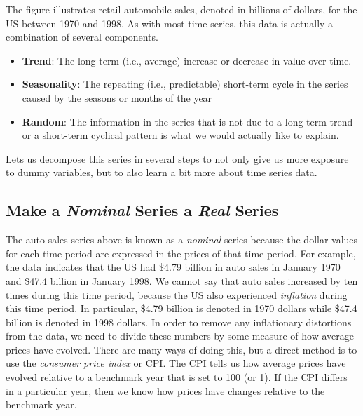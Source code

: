 \documentclass[
]{book}
\begin{document}
The figure illustrates retail automobile sales, denoted in billions of dollars, for the US between 1970 and 1998. As with most time series, this data is actually a combination of several components.

\begin{itemize}
\item
  \textbf{Trend}: The long-term (i.e., average) increase or decrease in value over time.
\item
  \textbf{Seasonality}: The repeating (i.e., predictable) short-term cycle in the series caused by the seasons or months of the year
\item
  \textbf{Random}: The information in the series that is not due to a long-term trend or a short-term cyclical pattern is what we would actually like to explain.
\end{itemize}

Lets us decompose this series in several steps to not only give us more exposure to dummy variables, but to also learn a bit more about time series data.

\subsection*{\texorpdfstring{Make a \emph{Nominal} Series a \emph{Real} Series}{Make a Nominal Series a Real Series}}\label{make-a-nominal-series-a-real-series}

The auto sales series above is known as a \emph{nominal} series because the dollar values for each time period are expressed in the prices of that time period. For example, the data indicates that the US had \$4.79 billion in auto sales in January 1970 and \$47.4 billion in January 1998. We cannot say that auto sales increased by ten times during this time period, because the US also experienced \emph{inflation} during this time period. In particular, \$4.79 billion is denoted in 1970 dollars while \$47.4 billion is denoted in 1998 dollars. In order to remove any inflationary distortions from the data, we need to divide these numbers by some measure of how average prices have evolved. There are many ways of doing this, but a direct method is to use the \emph{consumer price index} or CPI. The CPI tells us how average prices have evolved relative to a benchmark year that is set to 100 (or 1). If the CPI differs in a particular year, then we know how prices have changes relative to the benchmark year.
\end{document}
